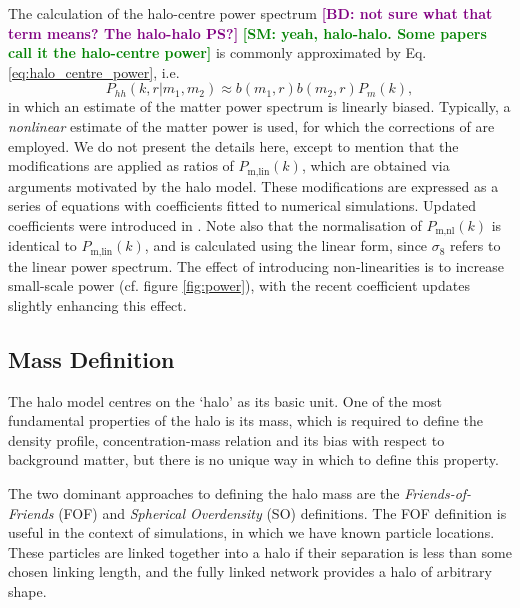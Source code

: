 \documentclass[5p]{elsarticle}
\newcommand{\bd}[1]{\textcolor{purple}{\textbf{[BD: #1]}}}
\newcommand{\sgm}[1]{\textcolor{green}{\textbf{[SM: #1]}}}
\begin{document}
The calculation of the halo-centre power spectrum \bd{not sure what that term means? The halo-halo PS?} \sgm{yeah, halo-halo. Some papers call it the halo-centre power} is commonly approximated by Eq. \ref{eq:halo_centre_power}, i.e.
\begin{equation*}
    P_{hh}(k,r|m_1,m_2) \approx b(m_1,r)b(m_2,r)P_m(k),
\end{equation*}
 in which an estimate of the matter power spectrum is linearly biased. Typically, a \textit{nonlinear} estimate of the matter power is used, for which the corrections of \citet[][hereafter \textsc{halofit}]{Smith2003} are employed. We do not present the details here, except to mention that the modifications are applied as ratios of $P_\text{m,lin}(k)$, which are obtained via arguments motivated by the halo model. These modifications are expressed as a series of equations with coefficients fitted to numerical simulations. Updated coefficients were introduced in \citet{Takahashi2012}. Note also that the normalisation of $P_\text{m,nl}(k)$ is identical to $P_\text{m,lin}(k)$, and is calculated using the linear form, since $\sigma_8$ refers to the linear power spectrum. The effect of introducing non-linearities is to increase small-scale power (cf. figure \ref{fig:power}), with the recent coefficient updates slightly enhancing this effect.

\subsection{Mass Definition}
\label{sec:theory:massdef}
The halo model centres on the `halo' as its basic unit.
One of the most fundamental properties of the halo is its mass, which is required to define the density profile, concentration-mass relation and its bias with respect to background matter, but there is no unique way in which to define this property. 

The two dominant approaches to defining the halo mass are the \textit{Friends-of-Friends} (FOF) and \textit{Spherical Overdensity} (SO) definitions. 
The FOF definition is useful in the context of simulations, in which we have known particle locations. These particles are linked together into a halo if their separation is less than some chosen linking length, and the fully linked network provides a halo of arbitrary shape.
\end{document}
